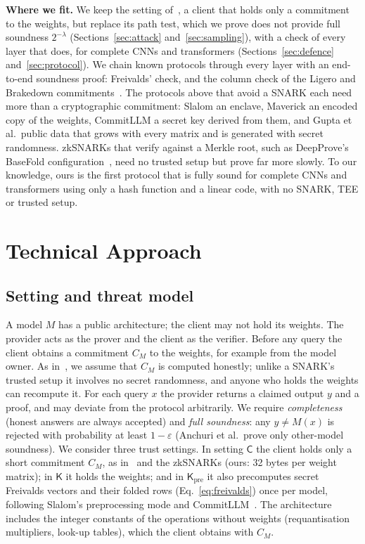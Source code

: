\documentclass[sigconf,nonacm]{acmart}
\newcommand{\Kpre}{\mathsf{K}_{\mathrm{pre}}}
\newcommand{\sC}{\mathsf{C}}
\newcommand{\sK}{\mathsf{K}}
\newcommand{\para}[1]{\par\noindent\textbf{#1}\quad}
\begin{document}
\para{Where we fit.} We keep the setting of~\cite{anchuri2026verifiable}, a client that holds only a commitment to the weights, but replace its path test, which we prove does not provide full soundness $2^{-\lambda}$
(Sections~\ref{sec:attack} and~\ref{sec:sampling}), with a check of every layer that does, for
complete CNNs and transformers (Sections~\ref{sec:defence} and~\ref{sec:protocol}). We chain known
protocols through every layer with an end-to-end soundness proof: Freivalds' check, and the
column check of the Ligero and Brakedown commitments~\cite{ligero,brakedown}. The protocols above that avoid a SNARK each need more than a cryptographic commitment: Slalom an enclave,
Maverick an encoded copy of the weights, CommitLLM a secret key derived from them, and Gupta et
al.\ public data that grows with every matrix and is generated with secret randomness. zkSNARKs
that verify against a Merkle root, such as DeepProve's BaseFold configuration~\cite{basefold}, need no trusted
setup but prove far more slowly. To our knowledge, ours is the first protocol that is fully sound
for complete CNNs and transformers using only a hash function and a linear code, with no SNARK,
TEE or trusted setup.

\section{Technical Approach}
\label{sec:approach}


\subsection{Setting and threat model}
A model $M$ has a public architecture; the client may not hold its weights. The provider acts as the
prover and the client as the verifier. Before any query the client obtains a commitment $C_M$ to
the weights, for example from the model owner. As in~\cite{anchuri2026verifiable}, we assume
that $C_M$ is computed honestly; unlike a SNARK's trusted setup it involves no secret randomness,
and anyone who holds the weights can recompute it. For each query $x$ the provider returns a
claimed output $y$ and a proof, and may deviate from the protocol arbitrarily. We require \emph{completeness} (honest answers are always accepted) and \emph{full soundness}: any
$y \neq M(x)$ is rejected with probability at least $1-\varepsilon$ (Anchuri et al.\ prove only
other-model soundness). We
consider three trust settings. In setting $\sC$ the client holds only a short commitment $C_M$, as in~\cite{anchuri2026verifiable} and the zkSNARKs (ours: 32 bytes per weight matrix); in $\sK$ it holds the weights; and
in $\Kpre$ it also precomputes secret Freivalds vectors and their folded rows
(Eq.~\eqref{eq:freivalds}) once per model, following Slalom's preprocessing mode and
CommitLLM~\cite{commitllm2026}. The architecture includes the integer constants of the operations without
weights (requantisation multipliers, look-up tables), which the client obtains with $C_M$.
\end{document}

